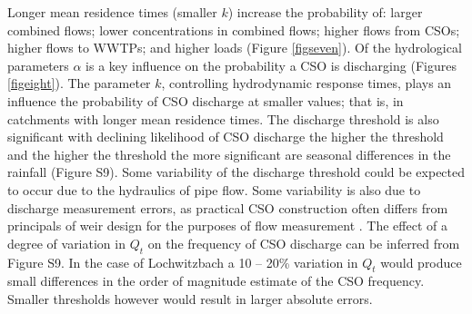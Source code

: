 \documentclass{agujournal2018}
\begin{document}
Longer mean residence times (smaller $k$) increase the probability of: larger combined f\/lows; lower concentrations in combined f\/lows; higher f\/lows from CSOs; higher flows to WWTPs; and higher loads (Figure \ref{figseven}). Of the hydrological parameters $\alpha$ is a key inf\/luence on the probability a CSO is discharging (Figures \ref{figeight}). The parameter $k$,  controlling hydrodynamic response times, plays an inf\/luence the probability of CSO discharge at smaller values; that is, in catchments with longer mean residence times. The discharge threshold is also signif\/icant with declining likelihood of CSO discharge the higher the threshold and the higher the threshold the more signif\/icant are seasonal dif\/ferences in the rainfall (Figure S9). Some variability of the discharge threshold could be expected to occur due to the hydraulics of pipe flow. Some variability is also due to discharge measurement errors, as practical CSO construction often differs from principals of weir design for the purposes of flow measurement \citep{Ahm_2016}. The effect of a degree of variation in $Q_t$ on the frequency of CSO discharge can be inferred from Figure S9.  In the case of Lochwitzbach a 10 – 20\% variation in $Q_t$ would produce small differences in the order of magnitude estimate of the CSO frequency. Smaller thresholds however would result in larger absolute errors.
\end{document}
